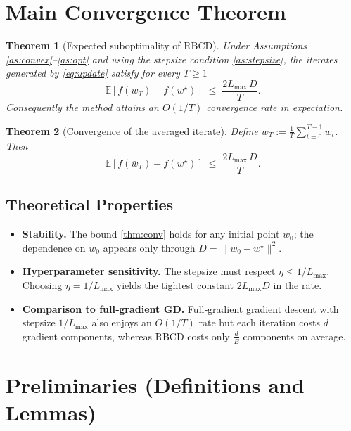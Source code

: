 \documentclass{article}
\newtheorem{theorem}{Theorem}
\newcommand{\E}{\mathbb{E}}
\begin{document}
\section*{Main Convergence Theorem}

\begin{theorem}[Expected suboptimality of RBCD]
\label{thm:conv}
Under Assumptions \ref{as:convex}–\ref{as:opt} and using the stepsize
condition \ref{as:stepsize}, the iterates generated by
\eqref{eq:update} satisfy for every $T\ge 1$
\[
\E\!\left[f(w_{T})-f(w^{\star})\right]\;\le\;
\frac{2L_{\max}\,D}{T}.
\]
Consequently the method attains an $O(1/T)$ convergence rate in
expectation.
\end{theorem}

\begin{theorem}[Convergence of the averaged iterate]
\label{thm:average}
Define $\bar w_{T}:=\frac{1}{T}\sum_{t=0}^{T-1} w_{t}$.
Then
\[
\E\!\left[f(\bar w_{T})-f(w^{\star})\right]\;\le\;
\frac{2L_{\max}\,D}{T}.
\]
\end{theorem}

\subsection*{Theoretical Properties}
\begin{itemize}[leftmargin=*]
\item \textbf{Stability.} The bound \eqref{thm:conv} holds for any
initial point $w_{0}$; the dependence on $w_{0}$ appears only through
$D=\|w_{0}-w^{\star}\|^{2}$.
\item \textbf{Hyperparameter sensitivity.}
The stepsize must respect $\eta\le 1/L_{\max}$.
Choosing $\eta=1/L_{\max}$ yields the tightest constant
$2L_{\max}D$ in the rate.
\item \textbf{Comparison to full‑gradient GD.}
Full‑gradient gradient descent with stepsize $1/L_{\max}$ also enjoys an
$O(1/T)$ rate but each iteration costs $d$ gradient components,
whereas RBCD costs only $\frac{d}{B}$ components on average.
\end{itemize}

\section*{Preliminaries (Definitions and Lemmas)}
\end{document}
